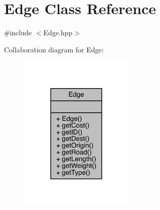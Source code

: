 \hypertarget{class_edge}{}\section{Edge Class Reference}
\label{class_edge}


{\ttfamily \#include $<$Edge.\+hpp$>$}



Collaboration diagram for Edge\+:
\nopagebreak
\begin{figure}[H]
\begin{center}
\leavevmode
\includegraphics[width=156pt]{class_edge__coll__graph}
\end{center}
\end{figure}
